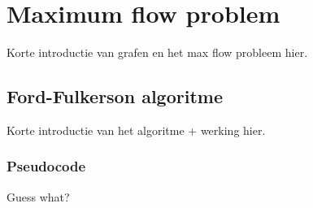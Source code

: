 \chapter{Maximum flow problem}

Korte introductie van grafen en het max flow probleem hier.

\section{Ford-Fulkerson algoritme}

Korte introductie van het algoritme + werking hier.

\subsection{Pseudocode}

Guess what?